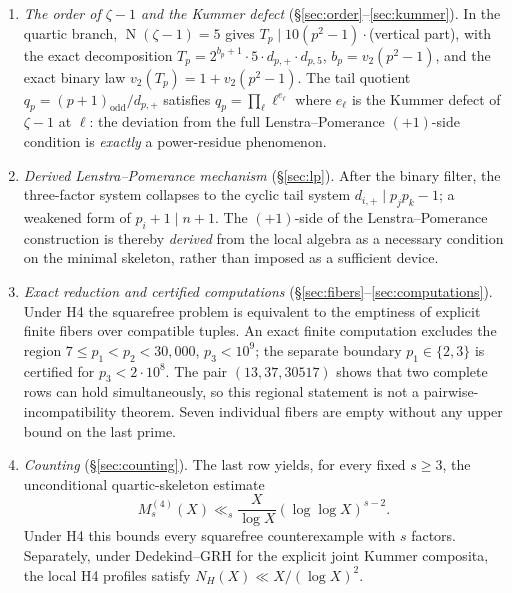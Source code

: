 \documentclass[11pt]{amsart}
\theoremstyle{definition}
\theoremstyle{remark}
\newcommand{\Norm}{\operatorname{N}}
\begin{document}
\begin{enumerate}
$n/p_i \equiv p_i^{j_i} \pmod{M_i}$ with determined exponents
$j_i \in \{0,2\}$.
\item \emph{The order of $\zeta-1$ and the Kummer defect}
(\S\ref{sec:order}--\ref{sec:kummer}). In the quartic branch,
$\Norm(\zeta-1) = 5$ gives $T_p \mid 10(p^2-1)\cdot{}$(vertical part), with
the exact decomposition $T_p = 2^{b_p+1}\cdot 5\cdot d_{p,+}\cdot d_{p,5}$,
$b_p = v_2(p^2-1)$, and the exact binary law $v_2(T_p) = 1 + v_2(p^2-1)$.
The tail quotient $q_p = (p+1)_{\mathrm{odd}}/d_{p,+}$ satisfies
$q_p = \prod_{\ell} \ell^{e_\ell}$ where $e_\ell$ is the Kummer defect of
$\zeta - 1$ at $\ell$: the deviation from the full Lenstra--Pomerance
$(+1)$-side condition is \emph{exactly} a power-residue phenomenon.
\item \emph{Derived Lenstra--Pomerance mechanism} (\S\ref{sec:lp}).
After the binary filter, the three-factor system collapses to the cyclic
tail system $d_{i,+} \mid p_jp_k - 1$; a weakened form of
$p_i + 1 \mid n+1$. The $(+1)$-side of the Lenstra--Pomerance construction
is thereby \emph{derived} from the local algebra as a necessary condition on
the minimal skeleton, rather than imposed as a sufficient device.
\item \emph{Exact reduction and certified computations}
(\S\ref{sec:fibers}--\ref{sec:computations}). Under H4 the squarefree
problem is equivalent to the emptiness of explicit finite fibers over
compatible tuples. An exact finite computation excludes the region
$7\le p_1<p_2<30{,}000$, $p_3<10^9$; the separate boundary
$p_1\in\{2,3\}$ is certified for $p_3<2\cdot10^8$. The pair
$(13,37,30517)$ shows that two complete rows can hold simultaneously,
so this regional statement is not a pairwise-incompatibility theorem.
Seven individual fibers are empty without any upper bound on the last
prime.
\item \emph{Counting} (\S\ref{sec:counting}). The last row yields, for
every fixed $s\ge3$, the unconditional quartic-skeleton estimate
\[
M_s^{(4)}(X)\ll_s
\frac{X}{\log X}(\log\log X)^{s-2}.
\]
Under H4 this bounds every squarefree counterexample with $s$ factors.
Separately, under Dedekind--GRH for the explicit joint Kummer composita,
the local H4 profiles satisfy $N_H(X)\ll X/(\log X)^2$.
\end{enumerate}
\end{document}

